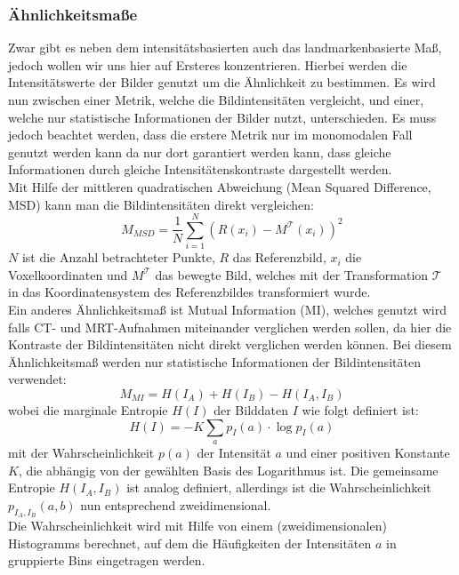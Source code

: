 \subsubsection{Ähnlichkeitsmaße}
Zwar gibt es neben dem intensitätsbasierten auch das landmarkenbasierte Maß,
jedoch wollen wir uns hier auf Ersteres konzentrieren. Hierbei werden die
Intensitätswerte der Bilder genutzt um die Ähnlichkeit zu bestimmen. Es wird
nun zwischen einer Metrik, welche die Bildintensitäten vergleicht, und einer,
welche nur statistische Informationen der Bilder nutzt, unterschieden. Es muss
jedoch beachtet werden, dass die erstere Metrik nur im monomodalen Fall genutzt
werden kann da nur dort garantiert werden kann, dass gleiche Informationen
durch gleiche Intensitätenskontraste dargestellt werden.\\
Mit Hilfe der mittleren quadratischen Abweichung (Mean Squared Difference, MSD)
kann man die Bildintensitäten direkt vergleichen:
\begin{equation}
  \label{eq:msd}
  M_{MSD}=\frac{1}{N} \sum_{i=1}^N (R(x_i)-M^\mathcal{T}(x_i))^2
\end{equation}
$N$ ist die Anzahl betrachteter Punkte, $R$ das Referenzbild, $x_i$ die
Voxelkoordinaten und $M^\mathcal{T}$ das bewegte Bild, welches mit der
Transformation $\mathcal{T}$ in das Koordinatensystem des Referenzbildes
transformiert wurde.\\
Ein anderes Ähnlichkeitsmaß ist Mutual Information (MI), welches genutzt wird
falls CT- und MRT-Aufnahmen miteinander verglichen werden sollen, da hier die
Kontraste der Bildintensitäten nicht direkt verglichen werden können. Bei
diesem Ähnlichkeitsmaß werden nur statistische Informationen der
Bildintensitäten verwendet:
\begin{equation}
  \label{eq:mi}
  M_{MI}=H(I_A)+H(I_B)-H(I_A,I_B)
\end{equation}
wobei die marginale Entropie $H(I)$ der Bilddaten $I$ wie folgt definiert ist:
\begin{equation}
  \label{eq:mi_h}
  H(I)=-K \sum_a p_I(a) \cdot \log{p_I(a)}
\end{equation}
mit der Wahrscheinlichkeit $p(a)$ der Intensität $a$ und einer positiven
Konstante $K$, die abhängig von der gewählten Basis des Logarithmus ist. Die
gemeinsame Entropie $H(I_A,I_B)$ ist analog definiert, allerdings ist die
Wahrscheinlichkeit $p_{I_A,I_B}(a,b)$ nun entsprechend zweidimensional.\\
Die Wahrscheinlichkeit wird mit Hilfe von einem (zweidimensionalen)
Histogramms berechnet, auf dem die Häufigkeiten der Intensitäten $a$ in
gruppierte Bins eingetragen werden.

